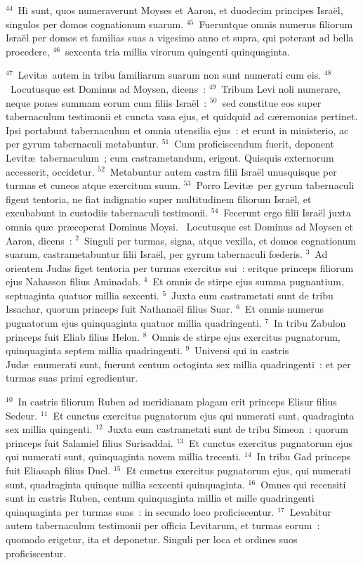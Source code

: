 ${}^{44}$~Hi sunt, quos numeraverunt Moyses et Aaron, et duodecim principes Isra\"el, singulos per domos cognationum suarum.
${}^{45}$~Fueruntque omnis numerus filiorum Isra\"el per domos et familias suas a vigesimo anno et supra, qui poterant ad bella procedere,
${}^{46}$~sexcenta tria millia virorum quingenti quinquaginta.


${}^{47}$~Levit\ae\ autem in tribu familiarum suarum non sunt numerati cum eis.
${}^{48}$~Locutusque est Dominus ad Moysen, dicens~:
${}^{49}$~Tribum Levi noli numerare, neque pones summam eorum cum filiis Isra\"el~:
${}^{50}$~sed constitue eos super tabernaculum testimonii et cuncta vasa ejus, et quidquid ad c\ae remonias pertinet. Ipsi portabunt tabernaculum et omnia utensilia ejus~: et erunt in ministerio, ac per gyrum tabernaculi metabuntur.
${}^{51}$~Cum proficiscendum fuerit, deponent Levit\ae\ tabernaculum~; cum castrametandum, erigent. Quisquis externorum accesserit, occidetur.
${}^{52}$~Metabuntur autem castra filii Isra\"el unusquisque per turmas et cuneos atque exercitum suum.
${}^{53}$~Porro Levit\ae\ per gyrum tabernaculi figent tentoria, ne fiat indignatio super multitudinem filiorum Isra\"el, et excubabunt in custodiis tabernaculi testimonii.
${}^{54}$~Fecerunt ergo filii Isra\"el juxta omnia qu\ae\ pr\ae ceperat Dominus Moysi.
~\lettrine[lines=10,image=true,loversize=0.05,lraise=-0.03]{L}{}ocutusque est Dominus ad Moysen et Aaron, dicens~:
${}^{2}$~Singuli per turmas, signa, atque vexilla, et domos cognationum suarum, castrametabuntur filii Isra\"el, per gyrum tabernaculi fœderis.
${}^{3}$~Ad orientem Judas figet tentoria per turmas exercitus sui~: eritque princeps filiorum ejus Nahasson filius Aminadab.
${}^{4}$~Et omnis de stirpe ejus summa pugnantium, septuaginta quatuor millia sexcenti.
${}^{5}$~Juxta eum castrametati sunt de tribu Issachar, quorum princeps fuit Nathana\"el filius Suar.
${}^{6}$~Et omnis numerus pugnatorum ejus quinquaginta quatuor millia quadringenti.
${}^{7}$~In tribu Zabulon princeps fuit Eliab filius Helon.
${}^{8}$~Omnis de stirpe ejus exercitus pugnatorum, quinquaginta septem millia quadringenti.
${}^{9}$~Universi qui in castris Jud\ae\ enumerati sunt, fuerunt centum octoginta sex millia quadringenti~: et per turmas suas primi egredientur.


${}^{10}$~In castris filiorum Ruben ad meridianam plagam erit princeps Elisur filius Sedeur.
${}^{11}$~Et cunctus exercitus pugnatorum ejus qui numerati sunt, quadraginta sex millia quingenti.
${}^{12}$~Juxta eum castrametati sunt de tribu Simeon~: quorum princeps fuit Salamiel filius Surisaddai.
${}^{13}$~Et cunctus exercitus pugnatorum ejus qui numerati sunt, quinquaginta novem millia trecenti.
${}^{14}$~In tribu Gad princeps fuit Eliasaph filius Duel.
${}^{15}$~Et cunctus exercitus pugnatorum ejus, qui numerati sunt, quadraginta quinque millia sexcenti quinquaginta.
${}^{16}$~Omnes qui recensiti sunt in castris Ruben, centum quinquaginta millia et mille quadringenti quinquaginta per turmas suas~: in secundo loco proficiscentur.
${}^{17}$~Levabitur autem tabernaculum testimonii per officia Levitarum, et turmas eorum~: quomodo erigetur, ita et deponetur. Singuli per loca et ordines suos proficiscentur.


